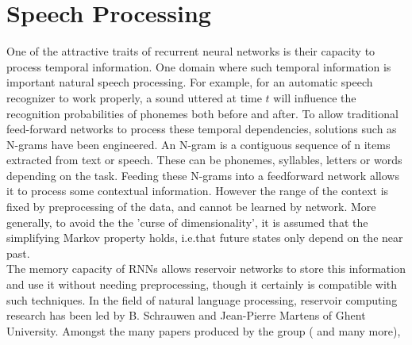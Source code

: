 \documentclass[12pt,oneside]{CUNY_CS_PhD}
\begin{document}

\section{Speech Processing}
One of the attractive traits of recurrent neural networks is their capacity to process temporal information. One domain where such temporal information is important natural speech processing. For example, for an automatic speech recognizer to work properly, a sound uttered at time $t$ will influence the recognition probabilities of phonemes both before and after. To allow traditional feed-forward networks to process these temporal dependencies, solutions such as 
N-grams have been engineered. An N-gram is a contiguous sequence of n items extracted from text or speech. These can be phonemes, syllables, letters or words depending on the task. Feeding these N-grams into a feedforward network allows it to process some contextual information. However the range of the context is fixed by preprocessing of the data, and cannot be learned by network. More generally, to avoid the the 'curse of dimensionality', it is assumed that the simplifying Markov property holds, i.e.that future states only depend on the near past.\\
The memory capacity of RNNs allows reservoir networks to store this information and use it without needing preprocessing, though it certainly is compatible with such techniques. In the field of natural language processing, reservoir computing research has been led by B. Schrauwen and Jean-Pierre Martens of Ghent University. Amongst the many papers produced by the group (\cite{verstraeten_isolated_2005, jalalvand_connected_2011} and many more), 
\end{document}
